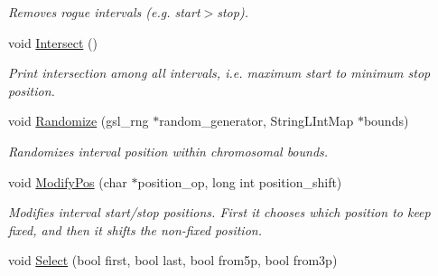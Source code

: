 \begin{CompactItemize}
\begin{CompactList}\small\item\em Removes rogue intervals (e.g. start$>$stop). \item\end{CompactList}\item 
\hypertarget{classGenomicRegionSAM_4f26b01325ebd4e20c9bf3247d5fa733}{
void \hyperlink{classGenomicRegionSAM_4f26b01325ebd4e20c9bf3247d5fa733}{Intersect} ()}
\label{classGenomicRegionSAM_4f26b01325ebd4e20c9bf3247d5fa733}

\begin{CompactList}\small\item\em Print intersection among all intervals, i.e. maximum start to minimum stop position. \item\end{CompactList}\item 
\hypertarget{classGenomicRegionSAM_538b8fc9969f24da6911ec39c8d70a3b}{
void \hyperlink{classGenomicRegionSAM_538b8fc9969f24da6911ec39c8d70a3b}{Randomize} (gsl\_\-rng $\ast$random\_\-generator, StringLIntMap $\ast$bounds)}
\label{classGenomicRegionSAM_538b8fc9969f24da6911ec39c8d70a3b}

\begin{CompactList}\small\item\em Randomizes interval position within chromosomal bounds. \item\end{CompactList}\item 
void \hyperlink{classGenomicRegionSAM_353207352073db00dee0a9b620dca197}{ModifyPos} (char $\ast$position\_\-op, long int position\_\-shift)
\begin{CompactList}\small\item\em Modifies interval start/stop positions. First it chooses which position to keep fixed, and then it shifts the non-fixed position. \item\end{CompactList}\item 
\hypertarget{classGenomicRegionSAM_4dce925fdb55dcc7ef3dad890bc25408}{
void \hyperlink{classGenomicRegionSAM_4dce925fdb55dcc7ef3dad890bc25408}{Select} (bool first, bool last, bool from5p, bool from3p)}
\label{classGenomicRegionSAM_4dce925fdb55dcc7ef3dad890bc25408}


\end{CompactItemize}
